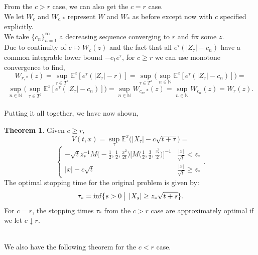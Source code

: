 \documentclass[12pt]{article}
\newcommand{\E}{\mathbb{E}}
\newcommand{\N}{\mathbb{N}}
\newcommand{\quantifyspace}{\hspace{2px} \big | \hspace{5px}}
\newcommand{\cheekynewline}{$\text{ }$\\}
\theoremstyle{definition}
\newtheorem{thm}{Theorem}
\begin{document}
From the $c > r$ case, we can also get the $c = r$ case. \\
We let $W_c$ and $W_{c, *}$ represent $W$ and $W_*$ as before except now with $c$ specified explicitly. \\
We take $\{c_n\}_{n=1}^\infty$ a decreasing sequence converging to $r$ and fix some $z$. \\
Due to continuity of $c \mapsto W_{c}(z)$ and the fact that all $e^\tau(|Z_\tau| - c_n)$ have a common integrable lower bound $- c_1 e^\tau$, for $c \geq r$ we can use monotone convergence to find,
\[
    W_{r, *}(z) = \sup_{\tau \in T^z} \E^z[e^\tau (|Z_\tau| - r)] =
    \sup_{\tau \in T^z} \bigg ( \sup_{n \in \N} \E^z[e^\tau (|Z_\tau| - c_n)]  \bigg ) =
\]
\[
    \sup_{n \in \N} \bigg ( \sup_{\tau \in T^z} \E^z[e^\tau (|Z_\tau| - c_n)]  \bigg ) =
    \sup_{n \in \N} W_{c_n, *}(z) =
    \sup_{n \in \N} W_{c_n}(z) = W_{r}(z).
\]
\cheekynewline
Putting it all together, we have now shown,
\begin{thm} \cite{peskir2006}
    Given $c \geq r$,
    \[
        V(t, x) = \sup_\tau \E^x  \Big ( |X_\tau| - c \sqrt{t + \tau} \Big ) =
    \]
    \[
        \begin{cases}
            - \sqrt{t} z_*^{-1} M \Big (-\frac{1}{2}, \frac{1}{2}, \frac{x^2}{2t} \Big) \Big [ M \Big (\frac{1}{2}, \frac{3}{2}, \frac{z_*^2}{2} \Big) \Big ]^{-1} & \frac{|x|}{\sqrt{t}} < z_* \\
            |x| - c \sqrt{t} & \frac{|x|}{\sqrt{t}} \geq z_*
        \end{cases}.
    \]
    The optimal stopping time for the original problem is given by:
    \[
        \tau_* = \inf \{s > 0 \quantifyspace |X_s| \geq z_* \sqrt{t + s}\}.
    \]
    For $c = r$, the stopping times $\tau_*$ from the $c > r$ case are approximately optimal if we let $c \downarrow r$. \\
\end{thm}
\cheekynewline
We also have the following theorem for the $c < r$ case. \\
\end{document}
